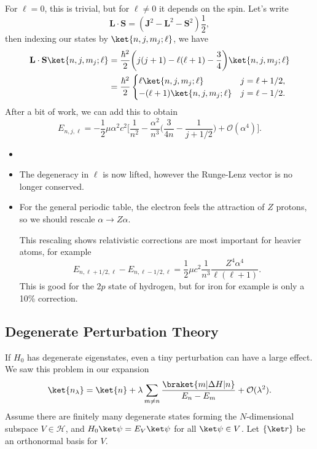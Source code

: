 \documentclass[12pt]{article}
\begin{document}
For $\ell = 0$, this is trivial, but for $\ell \neq 0$ it depends on the spin. Let's write
\[
\mathbf{L} \cdot \mathbf{S} = (\mathbf{J}^2 - \mathbf{L}^2 - \mathbf{S}^2)\frac{1}{2},
\]
then indexing our states by $\ket{n, j, m_j; \ell}$, we have
\begin{align*}
	\mathbf{L} \cdot \mathbf{S} \ket{n, j, m_j; \ell} &= \frac{\hbar^2}{2} \biggl(j(j+1) - \ell(\ell+1) - \frac{3}{4} \biggr) \ket{n, j, m_j; \ell} \\
							  &= \frac{\hbar^2}{2}
							  \begin{cases}
								  \ell \ket{n, j, m_j; \ell} & j = \ell + 1/2,\\
								  -(\ell+1)\ket{n, j, m_j; \ell} & j = \ell - 1/2.
							  \end{cases}
\end{align*}
After a bit of work, we can add this to obtain
\[
	E_{n, j, \ell } = - \frac{1}{2} \mu \alpha^2 c^2 \biggl[ \frac{1}{n^2} - \frac{\alpha^2}{n^3} \biggl(\frac{3}{4n} - \frac{1}{j + 1/2} \biggr) + \mathcal{O}(\alpha^{4}) \biggr].
\]
\begin{remark}
	\begin{itemize}
		\item[]
		\item The degeneracy in $\ell$ is now lifted, however the Runge-Lenz vector is no longer conserved.
		\item For the general periodic table, the electron feels the attraction of $Z$ protons, so we should rescale $\alpha \to Z \alpha$.

			This rescaling shows relativistic corrections are most important for heavier atoms, for example
			\[
			E_{n, \ell+1/2, \ell } - E_{n, \ell - 1/2, \ell } = \frac{1}{2} \mu c^2 \frac{1}{n^3} \frac{Z^4 \alpha^4}{\ell(\ell+1)}.
			\]
			 This is good for the $2p$ state of hydrogen, but for iron for example is only a 10\% correction.
	\end{itemize}
\end{remark}

\subsection{Degenerate Perturbation Theory}
\label{sub:deg_pt}

If $H_0$ has degenerate eigenstates, even a tiny perturbation can have a large effect. We saw this problem in our expansion
\[
	\ket{n_\lambda} = \ket{n} + \lambda \sum_{m \neq n} \frac{\braket{m|\Delta H| n}}{E_n - E_m} + \mathcal{O}(\lambda^2).
\]
Assume there are finitely many degenerate states forming the $N$-dimensional subspace $V \in \mathcal{H}$, and $H_0 \ket \psi = E_V \ket \psi$ for all $\ket \psi \in V$. Let $\{\ket r\}$ be an orthonormal basis for $V$.
\end{document}
